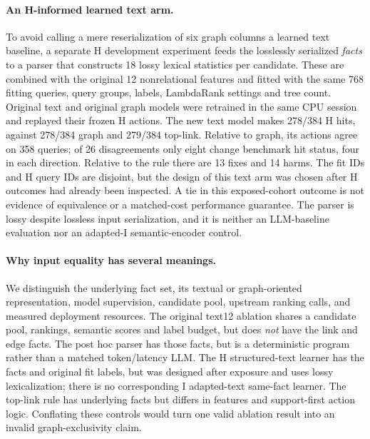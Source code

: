  \paragraph{An H-informed learned text arm.}
 To avoid calling a mere reserialization of six graph columns a learned
 text baseline, a separate H development experiment feeds the losslessly
 serialized \emph{facts} to a parser that constructs 18 lossy lexical
 statistics per candidate. These are combined with the original 12
 nonrelational features and fitted with the same 768 fitting queries,
 query groups, labels, LambdaRank settings and tree count. Original text
 and original graph models were retrained in the same CPU session and
 replayed their frozen H actions. The new text model makes 278/384
 H hits, against 278/384 graph and 279/384 top-link. Relative to graph,
 its actions agree on 358 queries; of 26 disagreements only eight change
 benchmark hit status, four in each direction. Relative to the rule
 there are 13 fixes and 14 harms. The fit IDs and H query IDs are disjoint,
 but the design of this text arm was chosen after H outcomes had already
 been inspected. A tie in this exposed-cohort outcome is not evidence
 of equivalence or a matched-cost performance guarantee. The parser is
 lossy despite lossless input serialization, and it is neither an
 LLM-baseline evaluation nor an adapted-I semantic-encoder control.

 \paragraph{Why input equality has several meanings.}
 We distinguish the underlying fact set, its textual or graph-oriented
 representation, model supervision, candidate pool, upstream ranking
 calls, and measured deployment resources. The original text12 ablation
 shares a candidate pool, rankings, semantic scores and label budget,
 but does \emph{not} have the link and edge facts. The post hoc parser
 has those facts, but is a deterministic program rather than a matched
 token/latency LLM. The H structured-text learner has the facts and
 original fit labels, but was designed after exposure and uses lossy
 lexicalization; there is no corresponding I adapted-text same-fact
 learner. The top-link rule has underlying facts but differs in features
 and support-first action logic. Conflating these controls would turn
 one valid ablation result into an invalid graph-exclusivity claim.

